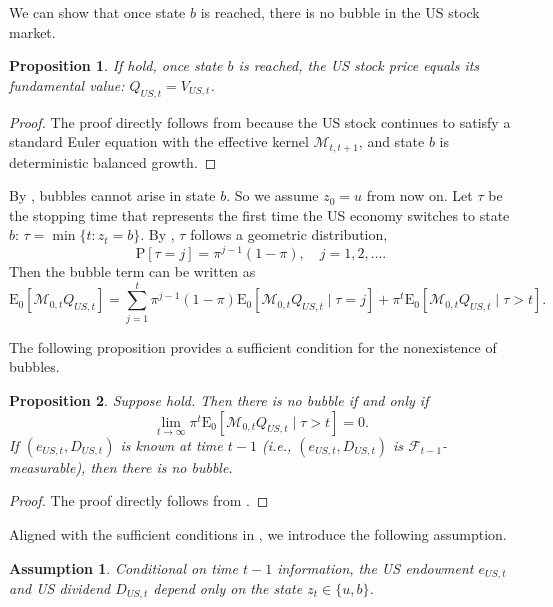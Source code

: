 \documentclass[12pt]{article}
\theoremstyle{plain}
\newtheorem{ass}{Assumption}
\newtheorem{prop}{Proposition}
\begin{document}
We can show that once state $b$ is reached, there is no bubble in the US stock market.

\begin{prop}\label{prop1}
If  hold, once state $b$ is reached, the US stock price equals its fundamental value:
$Q_{US,t}=V_{US,t}$.
\end{prop}

\begin{proof}
The proof directly follows from \citet{hirano2025technological} because the US stock continues to satisfy a standard
Euler equation with the effective kernel $\mathcal M_{t,t+1}$, and state $b$ is deterministic balanced growth.
\end{proof}

By , bubbles cannot arise in state $b$. So we assume $z_0=u$ from now on. Let $\tau$ be the stopping time that represents the first time the US economy switches to state $b$:
$\tau =\min \{t:z_t=b\}$. By , $\tau$ follows a geometric distribution,
\[
\mathrm{P}[\tau=j]=\pi^{j-1}(1-\pi), \quad j=1,2,\dots.
\]
Then the bubble term can be written as
\[
\mathrm{E}_0\left[\mathcal{M}_{0 , t} Q_{US,t}\right]
=\sum_{j=1}^t \pi^{j-1}(1-\pi) \mathrm{E}_0\left[\mathcal{M}_{0,t} Q_{US,t} \mid \tau=j\right]
+\pi^t \mathrm{E}_0\left[\mathcal{M}_{0, t} Q_{US,t} \mid \tau>t\right].
\]

The following proposition provides a sufficient condition for the nonexistence of bubbles.

\begin{prop}\label{prop2}
Suppose  hold. Then there is no bubble if and only if
\[
\lim _{t \rightarrow \infty} \pi^t \mathrm{E}_0\left[\mathcal{M}_{0,t} Q_{US,t} \mid \tau>t\right]=0.
\]
If $(e_{US,t}, D_{US,t})$ is known at time $t-1$ (i.e., $(e_{US,t},D_{US,t})$ is $\mathcal{F}_{t-1}$-measurable), then there is no bubble.
\end{prop}

\begin{proof}
The proof directly follows from \citet{hirano2025technological}.
\end{proof}

Aligned with the sufficient conditions in , we introduce the following assumption.

\begin{ass}\label{ass3}
Conditional on time $t-1$ information, the US endowment $e_{US,t}$ and US dividend $D_{US,t}$ depend only on the state
$z_t \in \{u,b\}$.
\end{ass}
\end{document}
